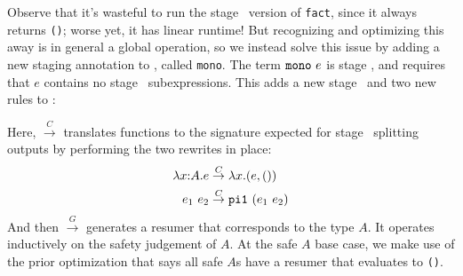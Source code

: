 Observe that it's wasteful to run the stage \bbtwo\ version of \texttt{fact}, since it
always returns \texttt{()}; worse yet, it has linear runtime!
But recognizing and optimizing this away is in general a global operation,
so we instead solve this issue by adding a new staging annotation to \lang, called
\texttt{mono}. The term ${\tt mono}~e$ is stage \bbone, and requires that $e$ contains
no stage \bbtwo\ subexpressions. This adds a new stage \bbmono\ and two new
rules to \lang:
Here, $\overset{C}{\rightarrow}$ translates functions to the signature expected for stage \bbone\ splitting outputs
by performing the two rewrites in place:
\begin{align*}
\lambda{x}\mathrm{:}{A}.{e} &\overset{C}{\rightarrow} \lambda x.(e,())\\
e_1~e_2 &\overset{C}{\rightarrow} {\tt pi1}~(e_1~e_2)
\end{align*}
And then $\overset{G}{\rightarrow}$ generates a resumer that corresponds to the type $A$.
It operates inductively on the safety judgement of $A$.
At the safe $A$ base case, we make use of the prior optimization that says all safe $A$s have a resumer that evaluates to \texttt{()}.